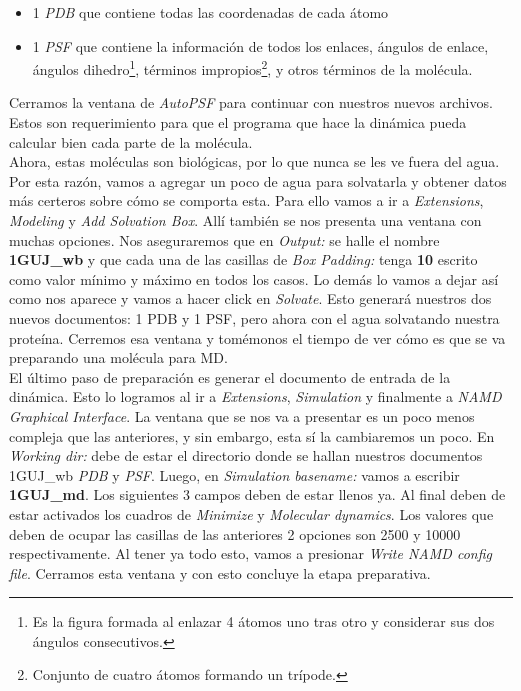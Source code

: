 \documentclass[10pt,letterpaper]{article}
\begin{document}
\begin{itemize}
\item 1 \emph{PDB} que contiene todas las coordenadas de cada \'atomo
\item 1 \emph{PSF} que contiene la informaci\'on de todos los enlaces, \'angulos de enlace, \'angulos dihedro\footnote{Es la figura formada al enlazar 4 \'atomos uno tras otro y considerar sus dos \'angulos consecutivos.}, t\'erminos impropios\footnote{Conjunto de cuatro \'atomos formando un tr\'ipode.}, y otros t\'erminos de la mol\'ecula.
\end{itemize}

Cerramos la ventana de \textit{AutoPSF} para continuar con nuestros nuevos archivos. Estos son requerimiento para que el programa que hace la din\'amica pueda calcular bien cada parte de la mol\'ecula.\\

Ahora, estas mol\'eculas son biol\'ogicas, por lo que nunca se les ve fuera del agua. Por esta raz\'on, vamos a agregar un poco de agua para solvatarla y obtener datos m\'as certeros sobre c\'omo se comporta esta. Para ello vamos a ir a \textit{Extensions}, \textit{Modeling} y \textit{Add Solvation Box}. All\'i tambi\'en se nos presenta una ventana con muchas opciones. Nos aseguraremos que en \textit{Output:} se halle el nombre \textbf{1GUJ\_wb} y que cada una de las casillas de \textit{Box Padding:} tenga \textbf{10} escrito como valor m\'inimo y m\'aximo en todos los casos. Lo dem\'as lo vamos a dejar as\'i como nos aparece y vamos a hacer click en \textit{Solvate}. Esto generar\'a nuestros dos nuevos documentos: 1 PDB y 1 PSF, pero ahora con el agua solvatando nuestra prote\'ina. Cerremos esa ventana y tom\'emonos el tiempo de ver c\'omo es que se va preparando una mol\'ecula para MD.\\

El \'ultimo paso de preparaci\'on es generar el documento de entrada de la din\'amica. Esto lo logramos al ir a \textit{Extensions}, \textit{Simulation} y finalmente a \textit{NAMD Graphical Interface}. La ventana que se nos va a presentar es un poco menos compleja que las anteriores, y sin embargo, esta s\'i la cambiaremos un poco. En \textit{Working dir:} debe de estar el directorio donde se hallan nuestros documentos 1GUJ\_wb \textit{PDB} y \textit{PSF}. Luego, en \textit{Simulation basename:} vamos a escribir \textbf{1GUJ\_md}. Los siguientes 3 campos deben de estar llenos ya. Al final deben de estar activados los cuadros de \textit{Minimize} y \textit{Molecular dynamics}. Los valores que deben de ocupar las casillas de las anteriores 2 opciones son 2500 y 10000 respectivamente. Al tener ya todo esto, vamos a presionar \textit{Write NAMD config file}. Cerramos esta ventana y con esto concluye la etapa preparativa.\\
\end{document}
